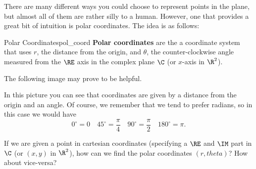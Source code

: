         There are many different ways you could choose to represent points in the plane, but almost all of them are rather silly to a human.  However, one that provides a great bit of intuition is polar coordinates. The idea is as follows:
        
        \begin{df}{Polar Coordinates}{pol_coord}
        \textbf{Polar coordinates} are the a coordinate system that uses $r$, the distance from the origin, and $\theta$, the counter-clockwise angle measured from the $\RE$ axis in the complex plane $\C$ (or $x$-axis in $\R^2$).
        \end{df}
        
        The following image may prove to be helpful.  
        
        \begin{center}
\end{center}
In this picture you can see that coordinates are given by a distance from the origin and an angle.  Of course, we remember that we tend to prefer radians, so in this case we would have
\[
0^\circ = 0 \quad 45^\circ = \frac{\pi}{4} \quad 90^\circ = \frac{\pi}{2} \quad 180^\circ = \pi.
\]

\begin{question}
        If we are given a point in cartesian coordinates (specifying a $\RE$ and $\IM$ part in $\C$ (or $(x,y)$ in $\R^2$), how can we find the polar coordinates $(r, theta)$? How about vice-versa?
\end{question}
        
